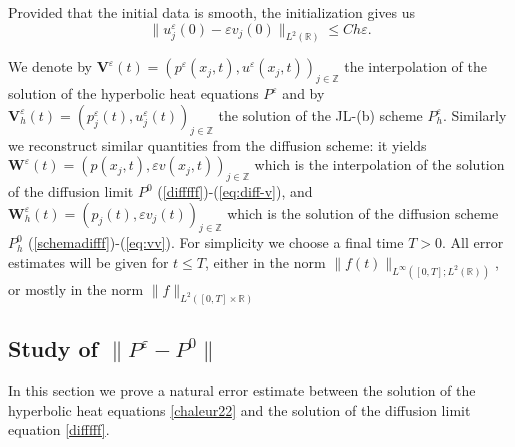 \documentclass[a4paper,french,english,10pt]{article}
\newcommand\eps{\varepsilon}
\newcommand\V{\mathbf{V}}
\newcommand\W{\mathbf{W}}
\begin{document}
Provided that the initial data is smooth, the initialization gives us 
\begin{equation}\label{init_1D}
 \| u_j^{\eps}(0)-\eps v_j(0)\|_{L^2(\mathbb{R})} \leq C h\eps .
\end{equation}


We denote by $\V^{\eps}(t)=\left(p^{\eps}(x_j,t),
u^{\eps}(x_j,t)\right)_{j\in \mathbb Z}$ the interpolation of the 
solution of the hyperbolic heat equations $P^\eps$ and by
$\V^{\eps}_h(t)=
\left(p_j^{\eps}(t), u_j^{\eps}(t)   \right)_{j\in \mathbb Z}$ the
solution of the JL-(b) scheme $P_h^\eps$. Similarly  we  reconstruct
similar quantities from the diffusion scheme: it yields 
$\W^\eps(t)=\left(p(x_j,t),\varepsilon v(x_j,t)\right)_{j\in \mathbb Z}$ 
which is the interpolation of the 
solution of the diffusion limit
$P^0$ (\ref{difffff})-(\ref{eq:diff-v}),
 and  $\W_h^\eps(t)=\left( p_j(t),  
\varepsilon v_j(t)   \right)_{j\in \mathbb Z}$ which is
the
solution of the diffusion scheme $P_h^0$ (\ref{schemadifff})-(\ref{eq:vv}). 
For simplicity we choose a final time $T>0$.
All  error estimates will be given for 
$t\leq T$, either
in the norm
$\|f(t)\|_{L^\infty([0,T];L^2(\mathbb{R}))}$, or mostly in the norm
$\|f\|_{L^2([0,T]\times \mathbb{R})}$



\subsection{Study of $\|P^\varepsilon-P^0  \|$}

In this section we prove a natural error estimate \cite{cveps}
between the solution of the
hyperbolic heat equations \eqref{chaleur22} and the solution of the diffusion
limit equation \eqref{difffff}. 
\end{document}
